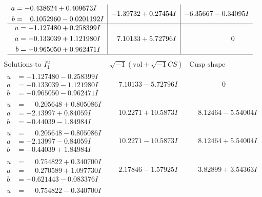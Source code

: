 \documentclass[1p]{elsarticle_modified}
\theoremstyle{definition}
\newcommand{\I}{\sqrt{-1}}
\begin{document}
$$\begin{array}{c|c|c}
\begin{aligned}
a &= -0.438624 + 0.409673 I \\
b &= \phantom{-}0.1052960 - 0.0201192 I\end{aligned}
 & -1.39732 + 0.27454 I & -6.35667 - 0.34095 I \\ \hline\begin{aligned}
u &= -1.127480 + 0.258399 I \\
a &= -0.133039 + 1.121980 I \\
b &= -0.965050 + 0.962471 I\end{aligned}
 & \phantom{-}7.10133 + 5.72796 I & \phantom{-0.000000 } 0\\
 \hline 
 \end{array}$$\newpage$$\begin{array}{c|c|c}  
\text{Solutions to }I^u_{1}& \I (\text{vol} + \sqrt{-1}CS) & \text{Cusp shape}\\
 \hline 
\begin{aligned}
u &= -1.127480 - 0.258399 I \\
a &= -0.133039 - 1.121980 I \\
b &= -0.965050 - 0.962471 I\end{aligned}
 & \phantom{-}7.10133 - 5.72796 I & \phantom{-0.000000 } 0 \\ \hline\begin{aligned}
u &= \phantom{-}0.205648 + 0.805086 I \\
a &= -2.13997 + 0.84059 I \\
b &= -0.44039 - 1.84984 I\end{aligned}
 & \phantom{-}10.2271 + 10.5873 I & \phantom{-}8.12464 - 5.54004 I \\ \hline\begin{aligned}
u &= \phantom{-}0.205648 - 0.805086 I \\
a &= -2.13997 - 0.84059 I \\
b &= -0.44039 + 1.84984 I\end{aligned}
 & \phantom{-}10.2271 - 10.5873 I & \phantom{-}8.12464 + 5.54004 I \\ \hline\begin{aligned}
u &= \phantom{-}0.754822 + 0.340700 I \\
a &= \phantom{-}0.270589 + 1.097730 I \\
b &= -0.621443 - 0.083376 I\end{aligned}
 & \phantom{-}2.17846 - 1.57925 I & \phantom{-}3.82899 + 3.54363 I \\ \hline\begin{aligned}
u &= \phantom{-}0.754822 - 0.340700 I \\

\end{aligned}
\end{array}$$
\end{document}

